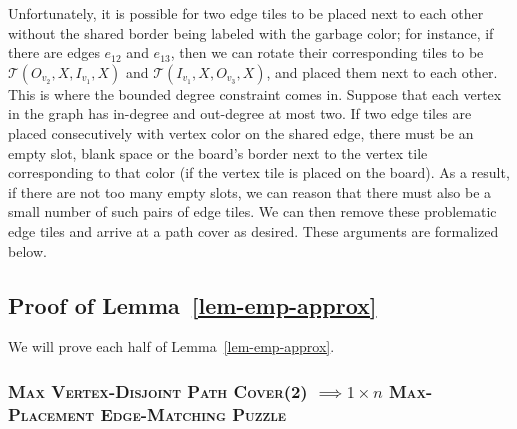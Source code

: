 \documentclass[11pt]{article}
\begin{document}
Unfortunately, it is possible for two edge tiles to be placed next to each other without the shared border being labeled with the garbage color; for instance, if there are edges $e_{12}$ and $e_{13}$, then we can rotate their corresponding tiles to be $\mathcal{T}(O_{v_2}, X, I_{v_1}, X)$ and $\mathcal{T}(I_{v_1}, X, O_{v_3}, X)$, and placed them next to each other. This is where the bounded degree constraint comes in. Suppose that each vertex in the graph has in-degree and out-degree at most two. If two edge tiles are placed consecutively with vertex color on the shared edge, there must be an empty slot, blank space or the board's border next to the vertex tile corresponding to that color (if the vertex tile is placed on the board). As a result, if there are not too many empty slots, we can reason that there must also be a small number of such pairs of edge tiles. We can then remove these problematic edge tiles and arrive at a path cover as desired. These arguments are formalized below.

\subsection{Proof of Lemma~\ref{lem-emp-approx}} \label{sec:red-memp-proof}

We will prove each half of Lemma~\ref{lem-emp-approx}.

\subsubsection*{\textsc{Max Vertex-Disjoint Path Cover(2)} $\implies $\textsc{$1 \times n$ Max-Placement Edge-Matching Puzzle}}


\end{document}
